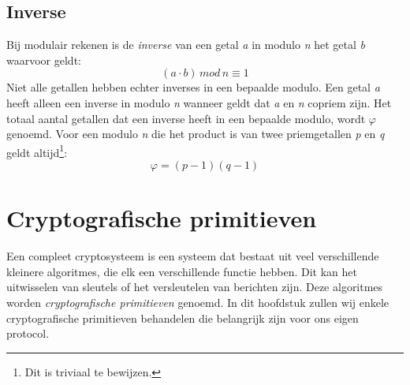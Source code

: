 \documentclass{report} %
\begin{document}
\section{Inverse}
Bij modulair rekenen is de \textit{inverse} van een getal \textit{a} in modulo \textit{n} het getal \textit{b} waarvoor geldt: 
\begin{equation}(a \cdot b) \, mod \, n \equiv 1\end{equation}
Niet alle getallen hebben echter inverses in een bepaalde modulo. Een getal \textit{a} heeft alleen een inverse in modulo \textit{n} wanneer geldt dat \textit{a} en \textit{n} copriem zijn. Het totaal aantal getallen dat een inverse heeft in een bepaalde modulo, wordt $\varphi$ genoemd. Voor een modulo \textit{n} die het product is van twee priemgetallen \textit{p} en \textit{q} geldt altijd\footnote{Dit is triviaal te bewijzen.}: 
\begin{equation} \varphi = (p-1)(q-1) \label{phieq} \end{equation}


\chapter{Cryptografische primitieven}
Een compleet cryptosysteem is een systeem dat bestaat uit veel verschillende kleinere algoritmes, die elk een verschillende functie hebben. Dit kan het uitwisselen van sleutels of het versleutelen van berichten zijn. Deze algoritmes worden \textit{cryptografische primitieven} genoemd. In dit hoofdstuk zullen wij enkele cryptografische primitieven behandelen die belangrijk zijn voor ons eigen protocol.
\end{document}
